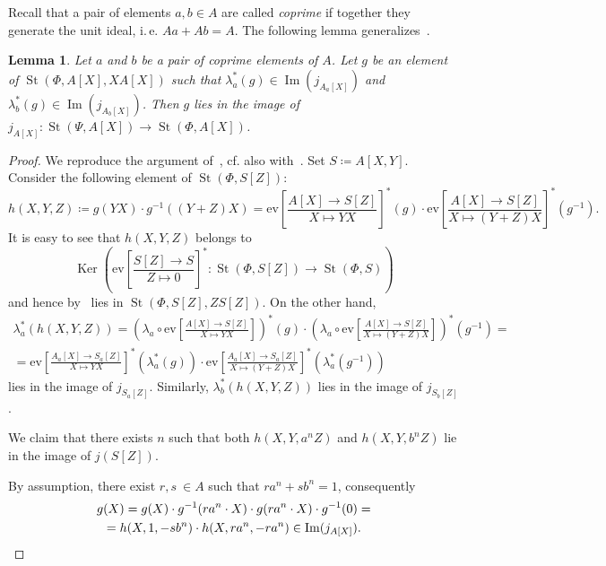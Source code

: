\documentclass[oneside, 10pt]{amsart}
\DeclareMathOperator{\St}{St}
\DeclareMathOperator{\Ker}{Ker}
\DeclareMathOperator{\Img}{Im}
\newcommand{\eval}[4]{\mathrm{ev} \textstyle \left[\frac{#2[#1] \rightarrow #3}{#1 \mapsto #4}\right]}
\newcommand{\ev}[3]{\eval{X}{#1}{#2}{#3}}
\numberwithin{equation}{section}
\numberwithin{thm}{section}
\newtheorem{lemma}[thm]{Lemma}
\numberwithin{lemma}{section}
\theoremstyle{definition}
\theoremstyle{remark}
\begin{document}
Recall that a pair of elements $a, b \in A$ are called \textit{coprime} if together they generate the unit ideal, i.\,e. $Aa + Ab = A$.
The following lemma generalizes~\cite[Lemma~2.5]{Tu83}.
\begin{lemma}\label{lem:L25-2}
Let $a$ and $b$ be a pair of coprime elements of $A$.
Let $g$ be an element of $\St(\Phi, A[X], XA[X])$ such that
$\lambda_a^*(g) \in \Img(j_{A_a[X]})$ and $\lambda_b^*(g) \in \Img(j_{A_b[X]})$.
Then $g$ lies in the image of $j_{A[X]} \colon \St(\Psi, A[X]) \to \St(\Phi, A[X])$.
\end{lemma}
\begin{proof}
We reproduce the argument of~\cite[Lemma~2.5]{Tu83}, cf. also with~\cite[Lemma~16]{S15}.
Set $S \coloneqq A[X, Y]$.
Consider the following element of $\St(\Phi, S[Z])$:
\[h(X, Y, Z) \coloneqq g(YX) \cdot  g^{-1}((Y+Z) X) = \ev{A}{S[Z]}{YX}^* \left(g\right) \cdot \ev{A}{S[Z]}{(Y + Z)X}^*\left(g^{-1}\right).\]
It is easy to see that $h(X, Y, Z)$ belongs to
\[\Ker\left(\eval{Z}{S}{S}{0}^*\colon\St(\Phi, S[Z]) \rightarrow \St(\Phi, S)\right)\]
and hence by~\cite[Lemma~8]{S15} lies in $\St(\Phi, S[Z], Z S[Z])$.
On the other hand, \begin{multline*}
\lambda_{a}^*(h(X, Y, Z)) = \left(\lambda_a\circ \ev{A}{S[Z]}{Y X}\right)^*(g) \cdot \left(\lambda_a\circ \ev{A}{S[Z]}{(Y + Z)X}\right)^*(g^{-1}) = \\
= \ev{A_a}{S_a[Z]}{YX}^*(\lambda_{a}^*(g)) \cdot \ev{A_a}{S_a[Z]}{(Y + Z)X}^*(\lambda_{a}^*(g^{-1})) \end{multline*}
lies in the image of $j_{S_a[Z]}$.
Similarly, $\lambda_{b}^*(h(X, Y, Z))$ lies in the image of $j_{S_b[Z]}$.

We claim that there exists $n$ such that both $h(X, Y, a^n Z)$ and $h(X, Y, b^n Z)$
lie in the image of $j(S[Z])$.

By assumption, there exist $r, s\ \in A$ such that $r a^n + s b^n = 1$, consequently
\begin{multline*}
g(X) = g(X)\cdot g^{-1}(ra^n\cdot X) \cdot g(ra^n\cdot X) \cdot g^{-1}(0) = \\
= h(X, 1, -sb^n) \cdot h(X, ra^n, -ra^n) \in \mathrm{Im}(j_{A[X]}). \qedhere
\end{multline*} \end{proof}
\end{document}
